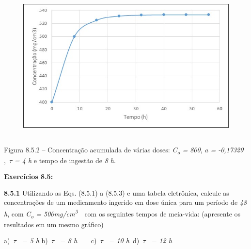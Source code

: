 \documentclass[12pt]{article}
\begin{document}
\begin{enumerate}
\begin{figure}[H]
	\begin{Center}
		\includegraphics[width=5.01in,height=3.01in]{./media/image12.jpeg}
	\end{Center}
\end{figure}



\par

\begin{justify}
Figura 8.5.2 – Concentração acumulada de várias doses: \textit{C\textsubscript{o} = 800}, \textit{a = -0,17329} ,\  \textit{$ \tau$  = 4 h} e tempo de ingestão de \textit{8 h}.
\end{justify}\par

\begin{justify}
\textbf{Exercícios 8.5:}
\end{justify}\par

\begin{justify}
\textbf{8.5.1}  Utilizando as Eqs. (8.5.1) a (8.5.3) e uma tabela eletrônica, calcule as concentrações de um medicamento ingerido em dose única para um período de \textit{48 h}, com \textit{C\textsubscript{o} = 500mg/cm\textsuperscript{3}}\ \  com os seguintes tempos de meia-vida: (apresente os resultados em um mesmo gráfico)
\end{justify}\par

\begin{justify}
a)\  \textit{$ \tau$ \  = 5 h} \tab \tab b)\  \textit{$ \tau$ \  = 8 h\  \tab \ \ \  }c)\  \textit{$ \tau$ \  = 10 h\  \tab }d)\  \textit{$ \tau$ \  = 12 h\  }
\end{justify}\par


\end{enumerate}
\end{document}
